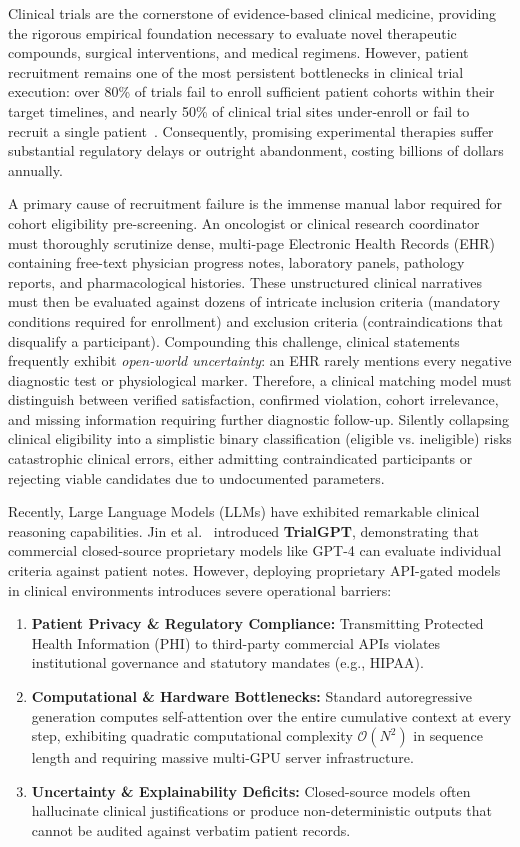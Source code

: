 \documentclass[conference]{IEEEtran}
\begin{document}
Clinical trials are the cornerstone of evidence-based clinical medicine, providing the rigorous empirical foundation necessary to evaluate novel therapeutic compounds, surgical interventions, and medical regimens. However, patient recruitment remains one of the most persistent bottlenecks in clinical trial execution: over 80\% of trials fail to enroll sufficient patient cohorts within their target timelines, and nearly 50\% of clinical trial sites under-enroll or fail to recruit a single patient~\cite{jin2024trialgpt}. Consequently, promising experimental therapies suffer substantial regulatory delays or outright abandonment, costing billions of dollars annually.

A primary cause of recruitment failure is the immense manual labor required for cohort eligibility pre-screening. An oncologist or clinical research coordinator must thoroughly scrutinize dense, multi-page Electronic Health Records (EHR) containing free-text physician progress notes, laboratory panels, pathology reports, and pharmacological histories. These unstructured clinical narratives must then be evaluated against dozens of intricate inclusion criteria (mandatory conditions required for enrollment) and exclusion criteria (contraindications that disqualify a participant). Compounding this challenge, clinical statements frequently exhibit \textit{open-world uncertainty}: an EHR rarely mentions every negative diagnostic test or physiological marker. Therefore, a clinical matching model must distinguish between verified satisfaction, confirmed violation, cohort irrelevance, and missing information requiring further diagnostic follow-up. Silently collapsing clinical eligibility into a simplistic binary classification (eligible vs. ineligible) risks catastrophic clinical errors, either admitting contraindicated participants or rejecting viable candidates due to undocumented parameters.

Recently, Large Language Models (LLMs) have exhibited remarkable clinical reasoning capabilities. Jin et al.~\cite{jin2024trialgpt} introduced \textbf{TrialGPT}, demonstrating that commercial closed-source proprietary models like GPT-4 can evaluate individual criteria against patient notes. However, deploying proprietary API-gated models in clinical environments introduces severe operational barriers:
\begin{enumerate}
    \item \textbf{Patient Privacy \& Regulatory Compliance:} Transmitting Protected Health Information (PHI) to third-party commercial APIs violates institutional governance and statutory mandates (e.g., HIPAA).
    \item \textbf{Computational \& Hardware Bottlenecks:} Standard autoregressive generation computes self-attention over the entire cumulative context at every step, exhibiting quadratic computational complexity $\mathcal{O}(N^2)$ in sequence length and requiring massive multi-GPU server infrastructure.
    \item \textbf{Uncertainty \& Explainability Deficits:} Closed-source models often hallucinate clinical justifications or produce non-deterministic outputs that cannot be audited against verbatim patient records.
\end{enumerate}
\end{document}
